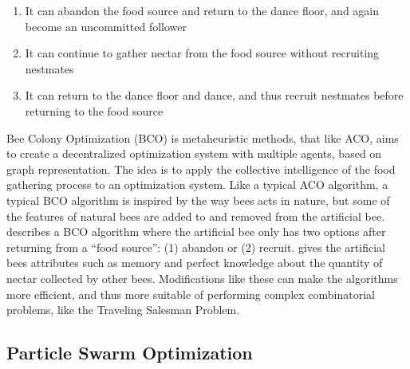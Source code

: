 \begin{enumerate}
  \item It can abandon the food source and return to the dance floor, and again become an uncommitted follower
  \item It can continue to gather nectar from the food source without recruiting nestmates
  \item It can return to the dance floor and dance, and thus recruit nestmates before returning to the food source
\end{enumerate}

Bee Colony Optimization (BCO) is metaheuristic methods, that like ACO, aims to create a decentralized optimization system with multiple agents, based on graph representation. The idea is to apply the collective intelligence of the food gathering process to an optimization system. Like a typical ACO algorithm, a typical BCO algorithm is inspired by the way bees acts in nature, but some of the features of natural bees are added to and removed from the artificial bee. \citet{nikolic14} describes a BCO algorithm where the artificial bee only has two options after returning from a ``food source'': (1) abandon or (2) recruit. \citet{lucic03} gives the artificial bees attributes such as memory and perfect knowledge about the quantity of nectar collected by other bees. Modifications like these can make the algorithms more efficient, and thus more suitable of performing complex combinatorial problems, like the Traveling Salesman Problem. 


\subsection{Particle Swarm Optimization}
